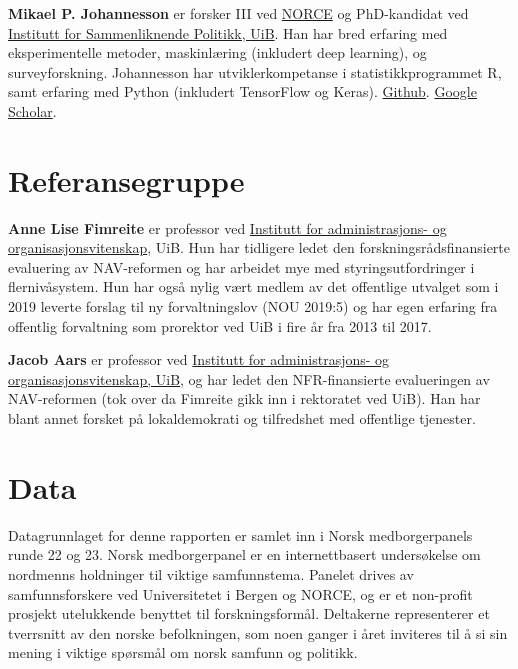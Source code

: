\documentclass[
]{book}
\begin{document}
\textbf{Mikael P. Johannesson} er forsker III ved \href{https://www.norceresearch.no/personer/sveinung-arnesen}{NORCE} og PhD-kandidat ved \href{https://www.uib.no/sampol}{Institutt for Sammenliknende Politikk, UiB}.
Han har bred erfaring med eksperimentelle metoder, maskinlæring (inkludert deep learning), og surveyforskning.
Johannesson har utviklerkompetanse i statistikkprogrammet R, samt erfaring med Python (inkludert TensorFlow og Keras). \href{https://github.com/mikajoh}{Github}. \href{https://scholar.google.com/citations?user=wG8CyVUAAAAJ\&hl=no\&oi=ao}{Google Scholar}.

\hypertarget{referansegruppe}{%
\section{Referansegruppe}\label{referansegruppe}}

\textbf{Anne Lise Fimreite} er professor ved \href{https://www.uib.no/personer/Anne.Lise.Fimreite}{Institutt for administrasjons- og organisasjonsvitenskap}, UiB.
Hun har tidligere ledet den forskningsrådsfinansierte evaluering av NAV-reformen og har arbeidet mye med styringsutfordringer i flernivåsystem.
Hun har også nylig vært medlem av det offentlige utvalget som i 2019 leverte forslag til ny forvaltningslov (NOU 2019:5) og har egen erfaring fra offentlig forvaltning som prorektor ved UiB i fire år fra 2013 til 2017.

\textbf{Jacob Aars} er professor ved \href{https://www.uib.no/personer/Jacob.Aars}{Institutt for administrasjons- og organisasjonsvitenskap, UiB}, og har ledet den NFR-finansierte evalueringen av NAV-reformen (tok over da Fimreite gikk inn i rektoratet ved UiB).
Han har blant annet forsket på lokaldemokrati og tilfredshet med offentlige tjenester.

\hypertarget{data}{%
\section{Data}\label{data}}

Datagrunnlaget for denne rapporten er samlet inn i Norsk medborgerpanels runde 22 og 23.
Norsk medborgerpanel er en internettbasert undersøkelse om nordmenns holdninger til viktige samfunnstema.
Panelet drives av samfunnsforskere ved Universitetet i Bergen og NORCE, og er et non-profit prosjekt utelukkende benyttet til forskningsformål.
Deltakerne representerer et tverrsnitt av den norske befolkningen, som noen ganger i året inviteres til å si sin mening i viktige spørsmål om norsk samfunn og politikk.
\end{document}
